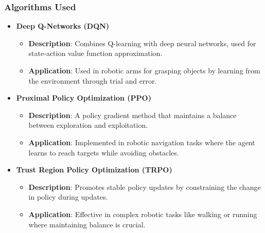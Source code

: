 \documentclass[aspectratio=169]{beamer}
\begin{document}
\begin{frame}[fragile]
    \frametitle{Algorithms Used}
    \begin{itemize}
        \item \textbf{Deep Q-Networks (DQN)}
        \begin{itemize}
            \item \textbf{Description}: Combines Q-learning with deep neural networks, used for state-action value function approximation.
            \item \textbf{Application}: Used in robotic arms for grasping objects by learning from the environment through trial and error.
        \end{itemize}
        
        \item \textbf{Proximal Policy Optimization (PPO)}
        \begin{itemize}
            \item \textbf{Description}: A policy gradient method that maintains a balance between exploration and exploitation.
            \item \textbf{Application}: Implemented in robotic navigation tasks where the agent learns to reach targets while avoiding obstacles.
        \end{itemize}

        \item \textbf{Trust Region Policy Optimization (TRPO)}
        \begin{itemize}
            \item \textbf{Description}: Promotes stable policy updates by constraining the change in policy during updates.
            \item \textbf{Application}: Effective in complex robotic tasks like walking or running where maintaining balance is crucial.
        \end{itemize}
    \end{itemize}
\end{frame}
\end{document}
